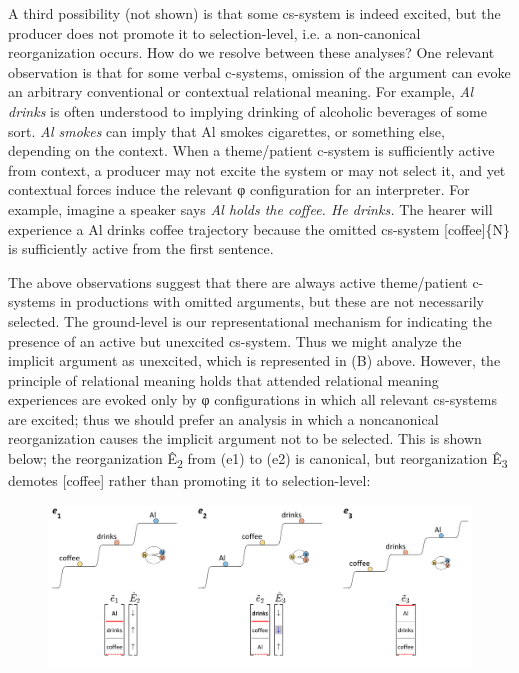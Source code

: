   A third possibility (not shown) is that some cs-system is indeed excited, but the producer does not promote it to selection-level, i.e. a non-canonical reorganization occurs. How do we resolve between these analyses? One relevant observation is that for some verbal c-systems, omission of the argument can evoke an arbitrary conventional or contextual relational meaning. For example, \textit{Al drinks} is often understood to implying drinking of alcoholic beverages of some sort. \textit{Al smokes} can imply that Al smokes cigarettes, or something else, depending on the context. When a theme/patient c-system is sufficiently active from context, a producer may not excite the system or may not select it, and yet contextual forces induce the relevant φ configuration for an interpreter. For example, imagine a speaker says \textit{Al holds the coffee. He drinks.} The hearer will experience a {\textbar}Al drinks coffee{\textbar} trajectory because the omitted cs-system [coffee]\{N\} is sufficiently active from the first sentence.

  The above observations suggest that there are always active theme/patient c-systems in productions with omitted arguments, but these are not necessarily selected. The ground-level is our representational mechanism for indicating the presence of an active but unexcited cs-system. Thus we might analyze the implicit argument as unexcited, which is represented in (B) above. However, the principle of relational meaning holds that attended relational meaning experiences are evoked only by φ configurations in which all relevant cs-systems are excited; thus we should prefer an analysis in which a noncanonical reorganization causes the implicit argument not to be selected. This is shown below; the reorganization Ê\textsubscript{2} from (e1) to (e2) is canonical, but reorganization Ê\textsubscript{3} demotes [coffee] rather than promoting it to selection-level:

  
\begin{figure}
\includegraphics[width=\textwidth]{figures/Tilsen-img87.png}
\caption{\missingcaption}
\label{fig:4:37}
\end{figure}
 

